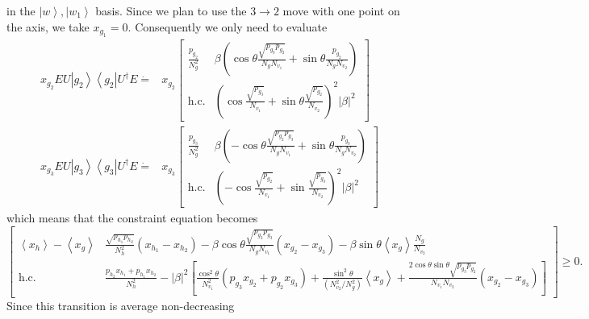 \documentclass{article}
\begin{document}
in the $\left|w\right\rangle ,\left|w_{1}\right\rangle $ basis. Since
we plan to use the $3\to2$ move with one point on the axis, we take
$x_{g_{1}}=0$. Consequently we only need to evaluate
\begin{align*}
  x_{g_{2}}EU\left|g_{2}\right\rangle \left\langle g_{2}\right|U^{\dagger}E\dot{=} & x_{g_{2}}\left[\begin{array}{cc}
                                                                                                        \frac{p_{g_{2}}}{N_{g}^{2}} & \beta\left(\cos\theta\frac{\sqrt{p_{g_{3}}p_{g_{2}}}}{N_{g}N_{v_{1}}}+\sin\theta\frac{p_{g_{2}}}{N_{g}N_{v_{2}}}\right)    \\
                                                                                                        \text{h.c.}                 & \left(\cos\frac{\sqrt{p_{g_{3}}}}{N_{v_{1}}}+\sin\theta\frac{\sqrt{p_{g_{2}}}}{N_{v_{2}}}\right)^{2}\left|\beta\right|^{2}
                                                                                                      \end{array}\right] \\
  x_{g_{3}}EU\left|g_{3}\right\rangle \left\langle g_{3}\right|U^{\dagger}E\dot{=} & x_{g_{3}}\left[\begin{array}{cc}
                                                                                                        \frac{p_{g_{3}}}{N_{g}^{2}} & \beta\left(-\cos\theta\frac{\sqrt{p_{g_{2}}p_{g_{3}}}}{N_{g}N_{v_{1}}}+\sin\theta\frac{p_{g_{3}}}{N_{g}N_{v_{2}}}\right) \\
                                                                                                        \text{h.c.}                 & \left(-\cos\frac{\sqrt{p_{g_{2}}}}{N_{v_{1}}}+\sin\frac{\sqrt{p_{g_{3}}}}{N_{v_{2}}}\right)^{2}\left|\beta\right|^{2}
                                                                                                      \end{array}\right]
\end{align*}
which means that the constraint equation becomes {\footnotesize 
    \begin{displaymath}
      \left[\begin{array}{cc}
          \left\langle x_{h}\right\rangle -\left\langle x_{g}\right\rangle & \frac{\sqrt{p_{h_{1}}p_{h_{2}}}}{N_{h}^{2}}(x_{h_{1}}-x_{h_{2}})-\beta\cos\theta\frac{\sqrt{p_{g_{2}}p_{g_{3}}}}{N_{g}N_{v_{1}}}(x_{g_{2}}-x_{g_{3}})-\beta\sin\theta\left\langle x_{g}\right\rangle \frac{N_{g}}{N_{v_{2}}}                                                                                                                                                 \\
          \text{h.c.}                                                      & \frac{p_{h_{2}}x_{h_{1}}+p_{h_{1}}x_{h_{2}}}{N_{h}^{2}}-\left|\beta\right|^{2}\left[\frac{\cos^{2}\theta}{N_{v_{1}}^{2}}(p_{g_{3}}x_{g_{2}}+p_{g_{2}}x_{g_{3}})+\frac{\sin^{2}\theta}{\left(N_{v_{2}}^{2}/N_{g}^{2}\right)}\left\langle x_{g}\right\rangle +\frac{2\cos\theta\sin\theta\sqrt{p_{g_{3}}p_{g_{2}}}}{N_{v_{1}}N_{v_{2}}}\left(x_{g_{2}}-x_{g_{3}}\right)\right]
        \end{array}\right]\ge0.
    \end{displaymath}
  }Since this transition is average non-decreasing
\end{document}
